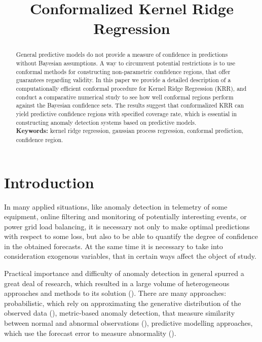 \documentclass[conference]{IEEEtran}
\title{Conformalized Kernel Ridge Regression}
\author{
\IEEEauthorblockN{
Burnaev\IEEEauthorrefmark{1}, E. V.,
Nazarov\IEEEauthorrefmark{2}, I. N.}
\IEEEauthorblockA{
\IEEEauthorrefmark{1}IITP RAS, Skoltech, e.burnaev@skoltech.ru}
\IEEEauthorblockA{\IEEEauthorrefmark{2} IITP RAS, ivan.nazarov@iitp.ru}
}
\begin{document}
\maketitle

\begin{abstract}
General predictive models do not provide a measure of confidence in predictions
without Bayesian assumptions. A way to circumvent potential restrictions is to
use conformal methods for constructing non-parametric confidence regions, that
offer guarantees regarding validity. In this paper we provide a detailed description
of a computationally efficient conformal procedure for Kernel Ridge Regression (KRR),
and conduct a comparative numerical study to see how well conformal regions perform
against the Bayesian confidence sets. The results suggest that conformalized KRR
can yield predictive confidence regions with specified coverage rate, which is
essential in constructing anomaly detection systems based on predictive models.\\
\textbf{Keywords:} kernel ridge regression, gaussian process regression,
conformal prediction, confidence region.
\end{abstract}

\section{Introduction} %
\label{sec:introduction}

In many applied situations, like anomaly detection in telemetry of some equipment,
online filtering and monitoring of potentially interesting events, or power grid
load balancing, it is necessary not only to make optimal predictions with respect
to some loss, but also to be able to quantify the degree of confidence in the obtained
forecasts. At the same time it is necessary to take into consideration exogenous
variables, that in certain ways affect the object of study. 

Practical importance and difficulty of anomaly detection in general spurred a great
deal of research, which resulted in a large volume of heterogeneous approaches and
methods to its solution (\cite{Alestra2014, Burnaev2015, Artemov2015}). There are many
approaches: probabilistic, which rely on approximating the generative distribution
of the observed data (\cite{aggarwal2008, scott2008}), metric-based anomaly detection,
that measure similarity between normal and abnormal observations (\cite{hautamaki2004,
breunig2000, kriegel2009}), predictive modelling approaches, which use the forecast
error to measure abnormality (\cite{augusteijn2002, hawkins2002, hoffmann2007, scholkopf1998}).
\end{document}
